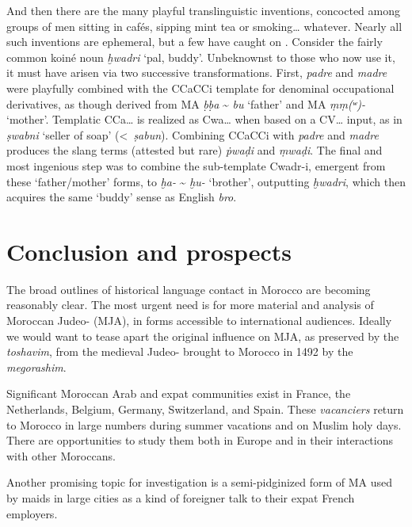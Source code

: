 \documentclass[output=paper]{langsci/langscibook}
\begin{document}
And then there are the many playful translinguistic inventions, concocted among groups of men sitting in cafés, sipping mint tea or smoking… whatever. Nearly all such inventions are ephemeral, but a few have caught on \citep{Heath1987}. Consider the fairly common koiné noun \textit{ḫwadri} ‘pal, buddy’. Unbeknownst to those who now use it, it must have arisen via two successive transformations. First,  \textit{padre} and \textit{madre} were playfully combined with the CCaCCi template for denominal occupational derivatives, as though derived from MA \textit{ḅḅa} {\textasciitilde} \textit{bu} ‘father’ and MA \textit{ṃṃ(ʷ)-} ‘mother’. Templatic CCa… is realized as Cwa… when based on a CV… input, as in \textit{ṣwabni} ‘seller of soap’ (<~\textit{ṣabun}). Combining CCaCCi with \textit{padre} and \textit{madre} produces the slang terms (attested but rare) \textit{ṗwaḍ{\R}i} and \textit{ṃwaḍ{\R}i}. The final and most ingenious step was to combine the sub-template Cwadr-i, emergent from these ‘father/mother’ forms, to \textit{ḫa-} {\textasciitilde} \textit{ḫu-} ‘brother’, outputting \textit{ḫwadri}, which then acquires the same ‘buddy’ sense as  {English} \textit{bro}. 

\section{Conclusion and prospects}

The broad outlines of historical language contact in Morocco are becoming reasonably clear. The most urgent need is for more material and analysis of Mor\-occan Judeo- (MJA), in forms accessible to international audiences. Ideally we would want to tease apart the original  influence on  MJA, as preserved by the \textit{toshavim}, from the medieval Judeo- brought to Morocco in 1492 by the \textit{megorashim}. 

Significant Moroccan Arab and  expat communities exist in France, the Netherlands, Belgium, Germany, Switzerland, and Spain. These \textit{vacanciers} return to Morocco in large numbers during summer vacations and on Muslim holy days. There are opportunities to study them both in Europe \citep{Nortier1990} and in their interactions with other Moroccans. 

Another promising topic for investigation is a semi-pidginized form of MA used by  maids in large cities as a kind of foreigner talk to their expat French employers.
\end{document}
